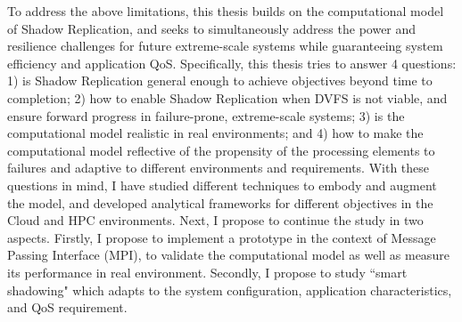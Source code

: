 To address the above limitations, this thesis builds on the computational model of Shadow Replication, and seeks to simultaneously address the power and resilience challenges for future extreme-scale systems while guaranteeing system efficiency and application QoS.
Specifically, this thesis tries to answer 4 questions: 1) is Shadow Replication general enough to achieve objectives beyond time to completion; %
2) how to enable Shadow Replication when DVFS is not viable, and ensure forward progress in failure-prone, extreme-scale systems; 3) is the computational model realistic in real environments; and 4) how to make the computational model reflective of the propensity of the processing elements to failures and adaptive to different environments and requirements.
With these questions in mind, 
I have studied different techniques to embody and augment the model, and developed analytical frameworks for different objectives in the Cloud and HPC environments.
Next, I propose to continue the study in two aspects.
Firstly, I propose to implement a prototype in the context of Message Passing Interface (MPI), to validate the 
computational model as well as measure its performance in real environment. Secondly, I propose to study  
``smart shadowing" which adapts to the system configuration, application characteristics, and QoS requirement.



